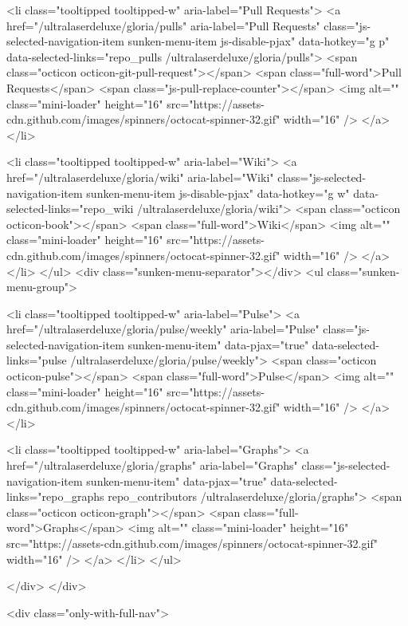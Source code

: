       <li class="tooltipped tooltipped-w" aria-label="Pull Requests">
        <a href="/ultralaserdeluxe/gloria/pulls" aria-label="Pull Requests" class="js-selected-navigation-item sunken-menu-item js-disable-pjax" data-hotkey="g p" data-selected-links="repo_pulls /ultralaserdeluxe/gloria/pulls">
            <span class="octicon octicon-git-pull-request"></span> <span class="full-word">Pull Requests</span>
            <span class="js-pull-replace-counter"></span>
            <img alt="" class="mini-loader" height="16" src="https://assets-cdn.github.com/images/spinners/octocat-spinner-32.gif" width="16" />
</a>      </li>


        <li class="tooltipped tooltipped-w" aria-label="Wiki">
          <a href="/ultralaserdeluxe/gloria/wiki" aria-label="Wiki" class="js-selected-navigation-item sunken-menu-item js-disable-pjax" data-hotkey="g w" data-selected-links="repo_wiki /ultralaserdeluxe/gloria/wiki">
            <span class="octicon octicon-book"></span> <span class="full-word">Wiki</span>
            <img alt="" class="mini-loader" height="16" src="https://assets-cdn.github.com/images/spinners/octocat-spinner-32.gif" width="16" />
</a>        </li>
    </ul>
    <div class="sunken-menu-separator"></div>
    <ul class="sunken-menu-group">

      <li class="tooltipped tooltipped-w" aria-label="Pulse">
        <a href="/ultralaserdeluxe/gloria/pulse/weekly" aria-label="Pulse" class="js-selected-navigation-item sunken-menu-item" data-pjax="true" data-selected-links="pulse /ultralaserdeluxe/gloria/pulse/weekly">
          <span class="octicon octicon-pulse"></span> <span class="full-word">Pulse</span>
          <img alt="" class="mini-loader" height="16" src="https://assets-cdn.github.com/images/spinners/octocat-spinner-32.gif" width="16" />
</a>      </li>

      <li class="tooltipped tooltipped-w" aria-label="Graphs">
        <a href="/ultralaserdeluxe/gloria/graphs" aria-label="Graphs" class="js-selected-navigation-item sunken-menu-item" data-pjax="true" data-selected-links="repo_graphs repo_contributors /ultralaserdeluxe/gloria/graphs">
          <span class="octicon octicon-graph"></span> <span class="full-word">Graphs</span>
          <img alt="" class="mini-loader" height="16" src="https://assets-cdn.github.com/images/spinners/octocat-spinner-32.gif" width="16" />
</a>      </li>
    </ul>


  </div>
</div>

              <div class="only-with-full-nav">
                
